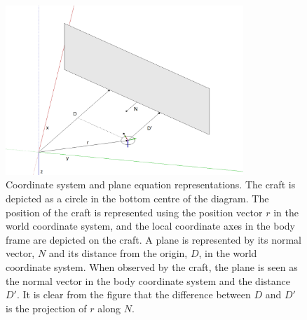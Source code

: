 \documentclass[]{article}
\begin{document}
{\begin{figure}[tb]
	\begin{center}
		\includegraphics[width=0.8\textwidth]{coordinatesystem.png}
	\end{center}
	\caption{Coordinate system and plane equation representations. The craft is depicted as a circle in the bottom centre of the diagram. The position of the craft is represented using the position vector $r$ in the world coordinate system, and the local coordinate axes in the body frame are depicted on the craft.
	A plane is represented by its normal vector, $N$ and its distance from the origin, $D$, in the world coordinate system. When observed by the craft, the plane is seen as the normal vector in the body coordinate system and the distance $D'$. It is clear from the figure that the difference between $D$ and $D'$ is the projection of $r$ along $N$.} \label{fig:coordinatesystem} \end{figure}

}
\end{document}
